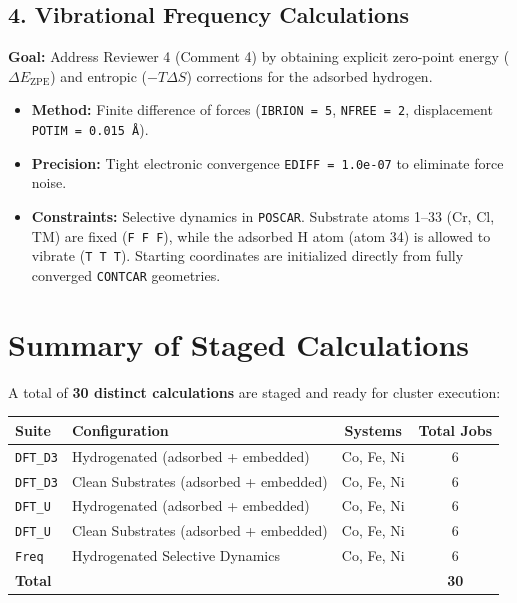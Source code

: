 \documentclass[11pt]{article}
\begin{document}
\subsection{4. Vibrational Frequency Calculations}
\textbf{Goal:} Address Reviewer 4 (Comment 4) by obtaining explicit zero-point energy ($\Delta E_{\text{ZPE}}$) and entropic ($-T\Delta S$) corrections for the adsorbed hydrogen.
\begin{itemize}
    \item \textbf{Method:} Finite difference of forces (\texttt{IBRION = 5}, \texttt{NFREE = 2}, displacement \texttt{POTIM = 0.015~\AA}).
    \item \textbf{Precision:} Tight electronic convergence \texttt{EDIFF = 1.0e-07} to eliminate force noise.
    \item \textbf{Constraints:} Selective dynamics in \texttt{POSCAR}. Substrate atoms 1--33 (Cr, Cl, TM) are fixed (\texttt{F F F}), while the adsorbed H atom (atom 34) is allowed to vibrate (\texttt{T T T}). Starting coordinates are initialized directly from fully converged \texttt{CONTCAR} geometries.
\end{itemize}

\section{Summary of Staged Calculations}
A total of \textbf{30 distinct calculations} are staged and ready for cluster execution:
\begin{table}[ht]
\centering
\begin{tabular}{llcc}
\toprule
\textbf{Suite} & \textbf{Configuration} & \textbf{Systems} & \textbf{Total Jobs} \\
\midrule
\texttt{DFT\_D3} & Hydrogenated (adsorbed + embedded) & Co, Fe, Ni & 6 \\
\texttt{DFT\_D3} & Clean Substrates (adsorbed + embedded) & Co, Fe, Ni & 6 \\
\texttt{DFT\_U}  & Hydrogenated (adsorbed + embedded) & Co, Fe, Ni & 6 \\
\texttt{DFT\_U}  & Clean Substrates (adsorbed + embedded) & Co, Fe, Ni & 6 \\
\texttt{Freq}    & Hydrogenated Selective Dynamics & Co, Fe, Ni & 6 \\
\midrule
\textbf{Total}   & & & \textbf{30} \\
\bottomrule
\end{tabular}
\end{table}
\end{document}
